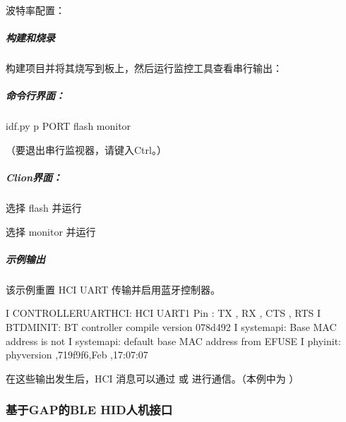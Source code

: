 \documentclass[a4paper,12pt,english]{sphinxmanual}
\begin{document}
{{\sphinxAtStartPar
{}波特率配置：


\subparagraph{构建和烧录}
\label{\detokenize{exp-esp32/bluetooth/hci:id4}}
\sphinxAtStartPar
构建项目并将其烧写到板上，然后运行监控工具查看串行输出：


\subparagraph{命令行界面：}
\label{\detokenize{exp-esp32/bluetooth/hci:id5}}
\begin{sphinxVerbatim}[commandchars=\\\{\}]
idf.py \PYGZhy{}p PORT flash monitor 
\end{sphinxVerbatim}

\sphinxAtStartPar
（要退出串行监视器，请键入Ctrl\sphinxhyphen{}{]}。）


\subparagraph{Clion界面：}
\label{\detokenize{exp-esp32/bluetooth/hci:clion}}
\sphinxAtStartPar
选择 flash 并运行

\sphinxAtStartPar
选择 monitor 并运行


\subparagraph{示例输出}
\label{\detokenize{exp-esp32/bluetooth/hci:id6}}
\sphinxAtStartPar
该示例重置 HCI UART 传输并启用蓝牙控制器。

\begin{sphinxVerbatim}[commandchars=\\\{\}]
I  CONTROLLER\PYGZus{}UART\PYGZus{}HCI: HCI UART1 Pin : TX , RX , CTS , RTS 
I  BTDM\PYGZus{}INIT: BT controller compile version \PYG{o}{[}078d492\PYG{o}{]}
I  system\PYGZus{}api: Base MAC address is not 
I  system\PYGZus{}api:  default base MAC address from EFUSE
I  phy\PYGZus{}init: phy\PYGZus{}version ,719f9f6,Feb  ,17:07:07
\end{sphinxVerbatim}

\sphinxAtStartPar
在这些输出发生后，HCI 消息可以通过  或  进行通信。（本例中为 ）

\sphinxstepscope


\subsubsection{基于GAP的BLE HID人机接口}
\label{\detokenize{exp-esp32/bluetooth/hid-gap:gapble-hid}}\label{\detokenize{exp-esp32/bluetooth/hid-gap::doc}}

}}
\end{document}
